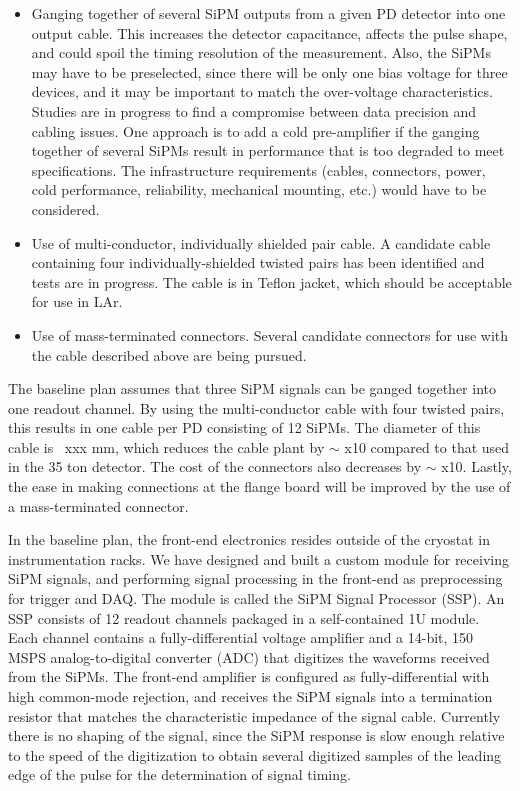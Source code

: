 \begin{itemize}
\item Ganging together of several SiPM outputs from a given PD
  detector into one output cable.  This increases the detector
  capacitance, affects the pulse shape, and could spoil the timing
  resolution of the measurement.  Also, the SiPMs may have to be
  preselected, since there will be only one bias voltage for three
  devices, and it may be important to match the over-voltage
  characteristics.  Studies are in progress to find a compromise
  between data precision and cabling issues. One approach is to add a
  cold pre-amplifier if the ganging together of several SiPMs result
  in performance that is too degraded to meet specifications.  The
  infrastructure requirements (cables, connectors, power, cold
  performance, reliability, mechanical mounting, etc.) would have to
  be considered.

\item Use of multi-conductor, individually shielded pair cable.  A
  candidate cable containing four individually-shielded twisted pairs
  has been identified and tests are in progress.  The cable is in
  Teflon jacket, which should be acceptable for use in LAr.

\item Use of mass-terminated connectors.  Several candidate connectors
  for use with the cable described above are being pursued.
\end{itemize}

The baseline plan assumes that three SiPM signals can be ganged
together into one readout channel.  By using the multi-conductor cable
with four twisted pairs, this results in one cable per PD consisting
of 12 SiPMs.  The diameter of this cable is ~xxx mm, which reduces the
cable plant by $\sim$ x10 compared to that used in the 35 ton
detector.  The cost of the connectors also decreases by $\sim$ x10.
Lastly, the ease in making connections at the flange board will be
improved by the use of a mass-terminated connector.

In the baseline plan, the front-end electronics resides outside of the
cryostat in instrumentation racks.  We have designed and built a
custom module for receiving SiPM signals, and performing signal
processing in the front-end as preprocessing for trigger and DAQ.  The
module is called the SiPM Signal Processor (SSP).  An SSP consists of
12 readout channels packaged in a self-contained 1U module.  Each
channel contains a fully-differential voltage amplifier and a 14-bit,
150 MSPS analog-to-digital converter (ADC) that digitizes the
waveforms received from the SiPMs.  The front-end amplifier is
configured as fully-differential with high common-mode rejection, and
receives the SiPM signals into a termination resistor that matches the
characteristic impedance of the signal cable.  Currently there is no
shaping of the signal, since the SiPM response is slow enough relative
to the speed of the digitization to obtain several digitized samples
of the leading edge of the pulse for the determination of signal
timing.

